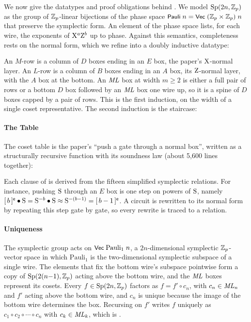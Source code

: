 \documentclass[acmsmall,screen,nonacm]{acmart}
\begin{document}
We now give the datatypes and proof obligations behind . We model $\mathrm{Sp}(2n,\mathbb{Z}_p)$ as the group of $\mathbb{Z}_p$-linear bijections of the phase space $\mbox{\textsf{\small Pauli}}\;n = \mbox{\textsf{\small Vec}}\;(\mathbb{Z}_p \times \mathbb{Z}_p)\;n$ that preserve the symplectic form. An element of the phase space lists, for each wire, the exponents of $\mathrm{X}^{a}\mathrm{Z}^{b}$ up to phase. Against this semantics, completeness rests on the normal form, which we refine into a doubly inductive datatype:



\medskip\noindent
An $M$-row is a column of $D$ boxes ending in an $E$ box, the paper's $\mathrm{X}$-normal layer. An $L$-row is a column of $B$ boxes ending in an $A$ box, its $\mathrm{Z}$-normal layer, with the $A$ box at the bottom. An $\mathit{ML}$ box at width $m \ge 2$ is either a full pair of rows or a bottom $D$ box followed by an $\mathit{ML}$ box one wire up, so it is a spine of $D$ boxes capped by a pair of rows. This is the first induction, on the width of a single coset representative. The second induction is the staircase:



\paragraph{The Table} The coset table is the paper's ``push a gate through a normal box'', written as a structurally recursive function  with its soundness law  (about 5{,}600 lines together):



\noindent Each clause of  is derived from the fifteen simplified symplectic relations. For instance, pushing $\mathrm{S}$ through an $E$ box is one step on powers of $\mathrm{S}$, namely $[\,b\,]^{\mathsf e} \bullet \mathrm{S} = \mathrm{S}^{-b} \bullet \mathrm{S} \approx \mathrm{S}^{-(b-1)} = [\,b-1\,]^{\mathsf e}$. A circuit is rewritten to its normal form by repeating this step gate by gate, so every rewrite is traced to a relation.

\paragraph{Uniqueness} The symplectic group acts on $\mbox{\textsf{\small Vec}}\;\mathrm{Pauli}_1\;n$, a $2n$-dimensional symplectic $\mathbb{Z}_p$-vector space in which $\mathrm{Pauli}_1$ is the two-dimensional symplectic subspace of a single wire. The elements that fix the bottom wire's subspace pointwise form a copy of $\mathrm{Sp}(2(n{-}1), \mathbb{Z}_p)$ acting above the bottom wire, and the $\mathit{ML}$ boxes represent its cosets. Every $f \in \mathrm{Sp}(2n,\mathbb{Z}_p)$ factors as $f = f' \circ c_n$, with $c_n \in \mathit{ML}_n$ and $f'$ acting above the bottom wire, and $c_n$ is unique because the image of the bottom wire determines the box. Recursing on $f'$ writes $f$ uniquely as $c_1 \circ c_2 \circ \cdots \circ c_n$ with $c_k \in \mathit{ML}_k$, which is .
\end{document}
